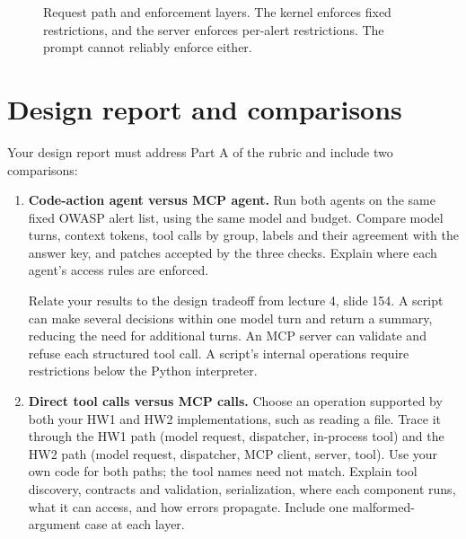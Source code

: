 \documentclass[9pt,letterpaper]{article}
\begin{document}
\begin{figure}[tbp]
\endgroup
\caption{Request path and enforcement layers. The kernel enforces fixed
restrictions, and the server enforces per-alert restrictions. The prompt cannot
reliably enforce either.}\label{fig:doors}
\end{figure}

\section{Design report and comparisons}\label{sec:report}

Your design report must address Part A of the rubric and include two comparisons:
\begin{enumerate}
\item \textbf{Code-action agent versus MCP agent.} Run both agents on the same
  fixed OWASP alert list, using the same model and budget. Compare model turns,
  context tokens, tool calls by group, labels and their agreement with the answer
  key, and patches accepted by the three checks. Explain where each agent's
  access rules are enforced.

  Relate your results to the design tradeoff from lecture 4, slide 154. A script
  can make several decisions within one model turn and return a summary, reducing
  the need for additional turns. An MCP server can validate and refuse each
  structured tool call. A script's internal operations require restrictions
  below the Python interpreter.
\item \textbf{Direct tool calls versus MCP calls.} Choose an operation supported
  by both your HW1 and HW2 implementations, such as reading a file. Trace it
  through the HW1 path (model request, dispatcher, in-process tool) and the HW2
  path (model request, dispatcher, MCP client, server, tool). Use your own code for
  both paths; the tool names need not match. Explain tool discovery, contracts
  and validation, serialization, where each component runs, what it can access,
  and how errors propagate. Include one malformed-argument case at each layer.
\end{enumerate}
\end{document}
